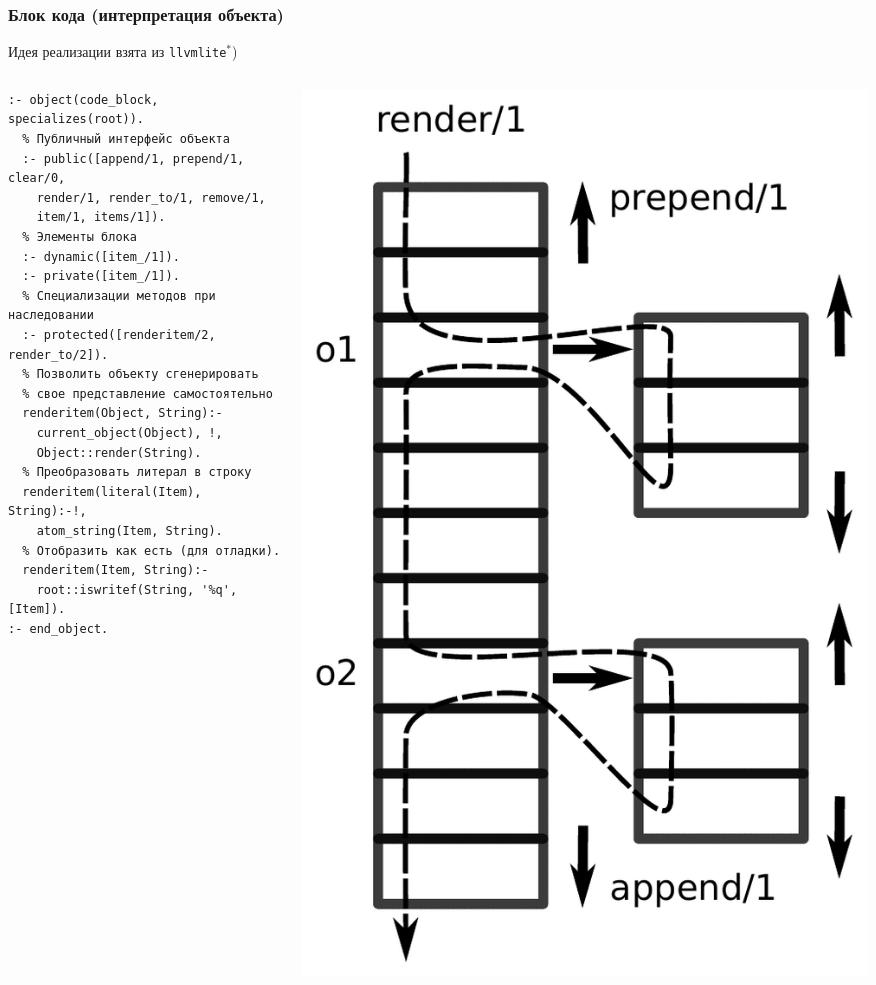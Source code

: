 \documentclass[10pt]{beamer}
\begin{document}
\begin{frame}[fragile]
\frametitle{Блок кода (интерпретация объекта)}
 Идея реализации взята из \texttt{llvmlite}${}^*$)
  \begin{columns}
    \begin{column}{0.6\textwidth}
      \flushleft
\begin{verbatim}
:- object(code_block, specializes(root)).
  % Публичный интерфейс объекта
  :- public([append/1, prepend/1, clear/0,
    render/1, render_to/1, remove/1,
    item/1, items/1]).
  % Элементы блока
  :- dynamic([item_/1]).
  :- private([item_/1]).
  % Специализации методов при наследовании
  :- protected([renderitem/2, render_to/2]).
  % Позволить объекту сгенерировать
  % свое представление самостоятельно
  renderitem(Object, String):-
    current_object(Object), !,
    Object::render(String).
  % Преобразовать литерал в строку
  renderitem(literal(Item), String):-!,
    atom_string(Item, String).
  % Отобразить как есть (для отладки).
  renderitem(Item, String):-
    root::iswritef(String, '%q', [Item]).
:- end_object.
\end{verbatim}
    \end{column}
    \begin{column}{0.4\textwidth}
      \includegraphics[width=1\linewidth]{code_block.pdf}

\end{column}
\end{columns}
\end{frame}
\end{document}
